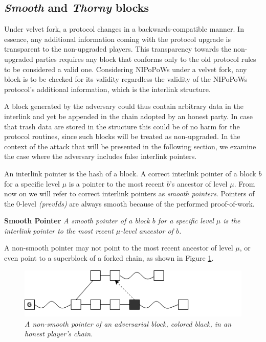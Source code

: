 \subsection{\textit{Smooth} and \textit{Thorny} blocks}
Under velvet fork, a protocol changes in a backwards-compatible manner. 
In essence, any additional information coming with the protocol upgrade 
is transparent to the non-upgraded players. This transparency towards the
non-upgraded parties requires any block that conforms only to the old protocol
rules to be considered a valid one. Considering NIPoPoWs under a velvet fork,
any block is to be checked for its validity regardless the validity of the 
NIPoPoWs protocol's additional information, which is the interlink structure.

A block generated by the adversary could thus contain arbitrary data in the interlink
and yet be appended in the chain adopted by an honest party. In case that trash
data are stored in the structure this could be of no harm for the protocol routines,
since such blocks will be treated as non-upgraded. In the context of the attack
that will be presented in the following section, we examine the case where the
adversary includes false interlink pointers. 

An interlink pointer is the hash of a block. A correct interlink pointer of a block $b$
for a specific level $\mu$ is a pointer to the most recent $b$'s ancestor of level
$\mu$. From now on we will refer to correct interlink pointers as \emph{smooth pointers}.
Pointers of the 0-level \textit{(prevIds)} are always smooth because of the
performed proof-of-work.

\begin{defn}{\textbf{Smooth Pointer}}
	\textit{A smooth pointer of a block $b$ for a specific level $\mu$ is the interlink 
	pointer to the most recent $\mu$-level ancestor of $b$.}
	\label{defn:smooth_pointer}
\end{defn}


A non-smooth pointer may not point to the most recent ancestor of level $\mu$, or even point to a superblock of a forked chain, as shown in Figure \ref{fig:false_interlink}.

\begin{figure}[h]
	\begin{center}
		\includegraphics[scale=0.6]{figures/false_interlink.png}
	\end{center}
	\caption{\textit{A non-smooth pointer of an adversarial block, colored black,
	in an honest player's chain.}}
	\label{fig:false_interlink}
\end{figure}

